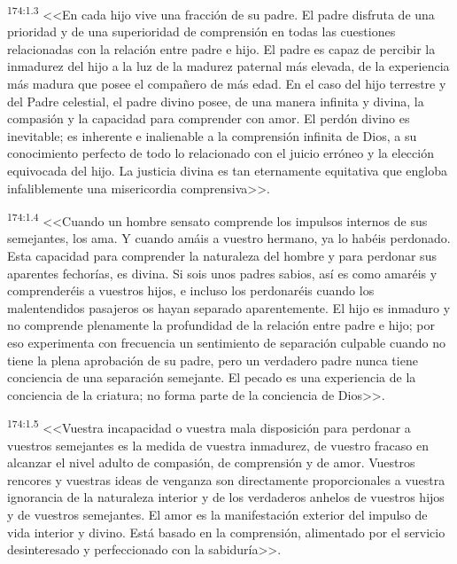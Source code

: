 \par 
\textsuperscript{174:1.3} <<En cada hijo vive una fracción de su padre. El padre disfruta de una prioridad y de una superioridad de comprensión en todas las cuestiones relacionadas con la relación entre padre e hijo. El padre es capaz de percibir la inmadurez del hijo a la luz de la madurez paternal más elevada, de la experiencia más madura que posee el compañero de más edad. En el caso del hijo terrestre y del Padre celestial, el padre divino posee, de una manera infinita y divina, la compasión y la capacidad para comprender con amor. El perdón divino es inevitable; es inherente e inalienable a la comprensión infinita de Dios, a su conocimiento perfecto de todo lo relacionado con el juicio erróneo y la elección equivocada del hijo. La justicia divina es tan eternamente equitativa que engloba infaliblemente una misericordia comprensiva>>.

\par 
\textsuperscript{174:1.4} <<Cuando un hombre sensato comprende los impulsos internos de sus semejantes, los ama. Y cuando amáis a vuestro hermano, ya lo habéis perdonado. Esta capacidad para comprender la naturaleza del hombre y para perdonar sus aparentes fechorías, es divina. Si sois unos padres sabios, así es como amaréis y comprenderéis a vuestros hijos, e incluso los perdonaréis cuando los malentendidos pasajeros os hayan separado aparentemente. El hijo es inmaduro y no comprende plenamente la profundidad de la relación entre padre e hijo; por eso experimenta con frecuencia un sentimiento de separación culpable cuando no tiene la plena aprobación de su padre, pero un verdadero padre nunca tiene conciencia de una separación semejante. El pecado es una experiencia de la conciencia de la criatura; no forma parte de la conciencia de Dios>>.

\par 
\textsuperscript{174:1.5} <<Vuestra incapacidad o vuestra mala disposición para perdonar a vuestros semejantes es la medida de vuestra inmadurez, de vuestro fracaso en alcanzar el nivel adulto de compasión, de comprensión y de amor. Vuestros rencores y vuestras ideas de venganza son directamente proporcionales a vuestra ignorancia de la naturaleza interior y de los verdaderos anhelos de vuestros hijos y de vuestros semejantes. El amor es la manifestación exterior del impulso de vida interior y divino. Está basado en la comprensión, alimentado por el servicio desinteresado y perfeccionado con la sabiduría>>.

